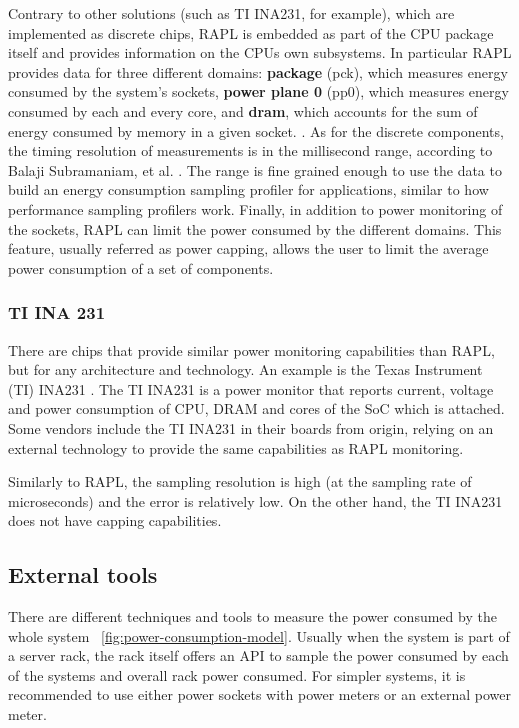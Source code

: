 Contrary to other solutions (such as TI INA231, for example), which are implemented as discrete
chips, RAPL is embedded as part of the CPU package itself and
provides information on the CPUs own subsystems. In particular RAPL
provides data for three different domains: \textbf{package} (pck),
which measures energy consumed by the system's sockets, \textbf{power
plane 0} (pp0), which measures energy consumed by each and every core,
and \textbf{dram}, which accounts for the sum of energy consumed
by memory in a given socket. \cite{INTELMAN}. As for the discrete components, the
timing resolution of measurements is in the millisecond range, according to Balaji Subramaniam, et al. \cite{RAPL1}.
The range is fine grained enough to use the data to build an energy
consumption sampling profiler for applications, similar to how performance
sampling profilers work.
Finally, in addition to power
monitoring of the sockets, RAPL can limit the power consumed by the
different domains. This feature, usually referred as power capping,
allows the user to limit the average power consumption of a set of components.

\subsubsection*{TI INA 231}
There are chips that provide similar power monitoring capabilities than RAPL, but for any architecture and technology. An example is the Texas Instrument (TI) INA231 \cite{TIINA231}. The TI INA231 is a power monitor that reports current, voltage and power consumption of CPU, DRAM and cores of the SoC which is attached. Some vendors include the TI INA231 in their boards from origin, relying on an external technology to provide the same capabilities as RAPL monitoring.

Similarly to RAPL, the sampling resolution is high (at the sampling rate of microseconds) and the error is relatively low. On the other hand, the TI INA231 does not have capping capabilities.


\subsection*{External tools}

There are different techniques and tools to measure the power consumed by the whole system ~\ref{fig:power-consumption-model}. Usually when the system is part of a server rack, the rack itself offers an API to sample the power consumed by each of the systems and overall rack power consumed. For simpler systems, it is recommended to use either power sockets with power meters or an external power meter. 

